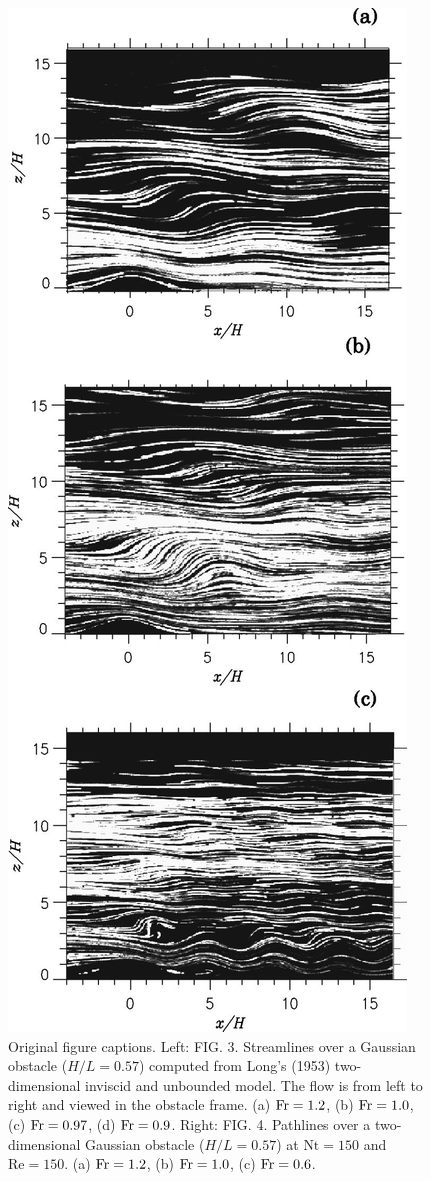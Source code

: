 \documentclass[11pt,letterpaper]{article}
\begin{document}
\begin{figure}
    \includegraphics[scale=0.9]{fig/experiement}
    \caption{Original figure captions. Left: FIG. 3. Streamlines over a Gaussian obstacle ($H/L=0.57$) computed from Long’s (1953) two-dimensional inviscid and unbounded model. The flow is from left to right and viewed in the obstacle frame. (a) $\text{Fr}=1.2$, (b) $\text{Fr}=1.0$, (c) $\text{Fr}=0.97$, (d) $\text{Fr}=0.9$. Right: FIG. 4. Pathlines over a two-dimensional Gaussian obstacle ($H/L=0.57$) at $\text{Nt}=150$ and $\text{Re}=150$. (a) $\text{Fr}=1.2$, (b) $\text{Fr}=1.0$, (c) $\text{Fr}=0.6$.}
    \label{fig:from_paper}
\end{figure}
\end{document}
